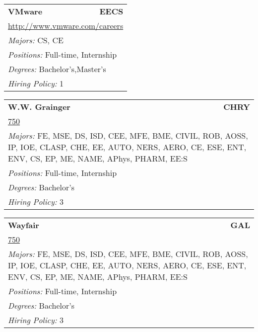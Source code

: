 \documentclass[twoside]{article}
\begin{document}
\begin{center}
\begin{multicols}{3}
\begin{FlushLeft}
\begin{minipage}{.9\columnwidth}\begin{tabularx}{.95\columnwidth}{Xr}
                 {\Large\bf VMware} & {\Large\bf EECS}\\
    \multicolumn{2}{p{.95\columnwidth}}{\url{http://www.vmware.com/careers}}\\
    \multicolumn{2}{p{.95\columnwidth}}{\emph{Majors:} CS, CE}\\
    \multicolumn{2}{p{.95\columnwidth}}{\emph{Positions:} Full-time, Internship}\\
    \multicolumn{2}{p{.95\columnwidth}}{\emph{Degrees:} Bachelor's,Master's}\\
    \multicolumn{2}{p{.95\columnwidth}}{\emph{Hiring Policy:} 1}\\
    \end{tabularx}
    
\end{minipage}
 
\begin{minipage}{.9\columnwidth}\begin{tabularx}{.95\columnwidth}{Xr}
                 {\Large\bf W.W. Grainger} & {\Large\bf CHRY}\\
    \multicolumn{2}{p{.95\columnwidth}}{\url{750}}\\
    \multicolumn{2}{p{.95\columnwidth}}{\emph{Majors:} FE, MSE, DS, ISD, CEE, MFE, BME, CIVIL, ROB, AOSS, IP, IOE, CLASP, CHE, EE, AUTO, NERS, AERO, CE, ESE, ENT, ENV, CS, EP, ME, NAME, APhys, PHARM, EE:S}\\
    \multicolumn{2}{p{.95\columnwidth}}{\emph{Positions:} Full-time, Internship}\\
    \multicolumn{2}{p{.95\columnwidth}}{\emph{Degrees:} Bachelor's}\\
    \multicolumn{2}{p{.95\columnwidth}}{\emph{Hiring Policy:} 3}\\
    \end{tabularx}
    
\end{minipage}
 
\begin{minipage}{.9\columnwidth}\begin{tabularx}{.95\columnwidth}{Xr}
                 {\Large\bf Wayfair} & {\Large\bf GAL}\\
    \multicolumn{2}{p{.95\columnwidth}}{\url{750}}\\
    \multicolumn{2}{p{.95\columnwidth}}{\emph{Majors:} FE, MSE, DS, ISD, CEE, MFE, BME, CIVIL, ROB, AOSS, IP, IOE, CLASP, CHE, EE, AUTO, NERS, AERO, CE, ESE, ENT, ENV, CS, EP, ME, NAME, APhys, PHARM, EE:S}\\
    \multicolumn{2}{p{.95\columnwidth}}{\emph{Positions:} Full-time, Internship}\\
    \multicolumn{2}{p{.95\columnwidth}}{\emph{Degrees:} Bachelor's}\\
    \multicolumn{2}{p{.95\columnwidth}}{\emph{Hiring Policy:} 3}\\
    \end{tabularx}
    

\end{minipage}
\end{FlushLeft}
\end{multicols}
\end{center}
\end{document}
